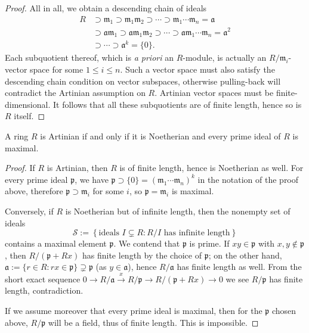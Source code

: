 \begin{proof}
	All in all, we obtain a descending chain of ideals
	\begin{align*}
		R & \supset \mathfrak{m}_1 \supset \mathfrak{m}_1 \mathfrak{m}_2 \supset \cdots \supset \mathfrak{m}_1 \cdots \mathfrak{m}_n = \mathfrak{a} \\
		& \supset \mathfrak{a} \mathfrak{m}_1 \supset \mathfrak{a} \mathfrak{m}_1 \mathfrak{m}_2 \supset \cdots \supset \mathfrak{a} \mathfrak{m}_1 \cdots \mathfrak{m}_n = \mathfrak{a}^2 \\
		& \supset \cdots \supset \mathfrak{a}^k = \{0\}.
	\end{align*}
	Each subquotient thereof, which is \textit{a priori} an $R$-module, is actually an $R/\mathfrak{m}_i$-vector space for some $1 \leq i \leq n$. Such a vector space must also satisfy the descending chain condition on vector subspaces, otherwise pulling-back will contradict the Artinian assumption on $R$. Artinian vector spaces must be finite-dimensional. It follows that all these subquotients are of finite length, hence so is $R$ itself.
\end{proof}

\begin{corollary}\label{prop:Artinian-dim-0}
	A ring $R$ is Artinian if and only if it is Noetherian and every prime ideal of $R$ is maximal.
\end{corollary}
\begin{proof}
	If $R$ is Artinian, then $R$ is of finite length, hence is Noetherian as well. For every prime ideal $\mathfrak{p}$, we have $\mathfrak{p} \supset \{0\} = (\mathfrak{m}_1 \cdots \mathfrak{m}_n)^k$ in the notation of the proof above, therefore $\mathfrak{p} \supset \mathfrak{m}_i$ for some $i$, so $\mathfrak{p} = \mathfrak{m}_i$ is maximal.

	Conversely, if $R$ is Noetherian but of infinite length, then the nonempty set of ideals
	\[ \mathcal{S} := \left\{ \text{ideals } I \subsetneq R: R/I \text{ has infinite length} \right\} \]
	contains a maximal element $\mathfrak{p}$. We contend that $\mathfrak{p}$ is prime. If $xy \in \mathfrak{p}$ with $x,y \notin \mathfrak{p}$, then $R/(\mathfrak{p}+Rx)$ has finite length by the choice of $\mathfrak{p}$; on the other hand, $\mathfrak{a} := \{ r \in R: rx \in \mathfrak{p}\} \supsetneq \mathfrak{p}$ (as $y \in \mathfrak{a}$), hence $R/\mathfrak{a}$ has finite length as well. From the short exact sequence $0 \to R/\mathfrak{a} \xrightarrow{x} R/\mathfrak{p} \to R/(\mathfrak{p}+Rx) \to 0$ we see $R/\mathfrak{p}$ has finite length, contradiction.
	
	If we assume moreover that every prime ideal is maximal, then for the $\mathfrak{p}$ chosen above, $R/\mathfrak{p}$ will be a field, thus of finite length. This is impossible.
\end{proof}


